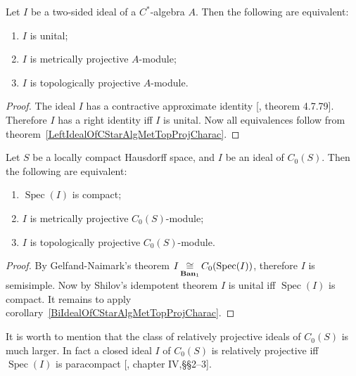 \begin{corollary}\label{BiIdealOfCStarAlgMetTopProjCharac} Let $I$ be a
two-sided ideal of a $C^*$-algebra $A$. Then the following are equivalent:

\begin{enumerate}[label = (\roman*)]
    \item $I$ is unital;

    \item $I$ is metrically projective $A$-module;

    \item $I$ is topologically projective $A$-module.
\end{enumerate}
\end{corollary}
\begin{proof} The ideal $I$ has a contractive approximate identity
[\cite{HelBanLocConvAlg}, theorem 4.7.79]. Therefore $I$ has a right identity
iff $I$ is unital. Now all equivalences follow from
theorem~\ref{LeftIdealOfCStarAlgMetTopProjCharac}. 
\end{proof}

\begin{corollary}\label{IdealofCommCStarAlgMetTopProjCharac} Let $S$ be a
locally compact Hausdorff space, and $I$ be an ideal of $C_0(S)$. Then the
following are equivalent:

\begin{enumerate}[label = (\roman*)]
    \item $\operatorname{Spec}(I)$ is compact;

    \item $I$ is metrically projective $C_0(S)$-module;

    \item $I$ is topologically projective $C_0(S)$-module.
\end{enumerate}
\end{corollary}
\begin{proof} By Gelfand-Naimark's theorem
$I\mathop{\mathbin{\cong}}\limits_{\mathbf{Ban}_1}C_0(\operatorname{Spec}(I))$, therefore $I$ is
semisimple. Now by Shilov's idempotent theorem $I$ is unital iff
$\operatorname{Spec}(I)$ is compact. It remains to apply
corollary~\ref{BiIdealOfCStarAlgMetTopProjCharac}. 
\end{proof}

It is worth to mention that the class of relatively projective ideals of
$C_0(S)$ is much larger. In fact a closed ideal $I$ of $C_0(S)$ is relatively
projective iff $\operatorname{Spec}(I)$ is paracompact
[\cite{HelHomolBanTopAlg}, chapter IV,\S\S 2--3].

